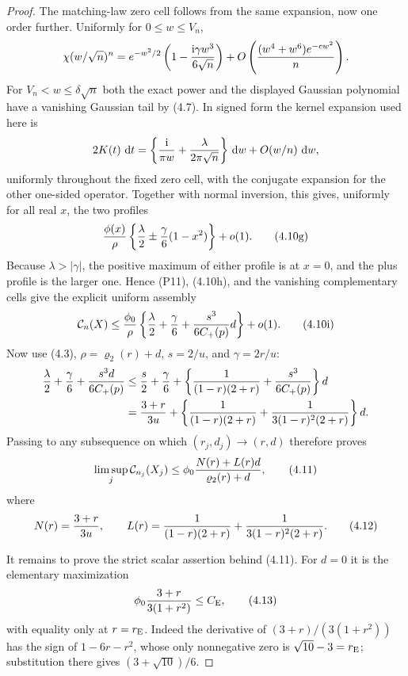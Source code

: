 \documentclass[11pt,a4paper]{article}
\numberwithin{equation}{section}
\theoremstyle{definition}
\theoremstyle{remark}
\newcommand{\ii}{\mathrm i}
\newcommand{\dd}{\,\mathrm d}
\newcommand{\CE}{C_{\mathrm E}}
\begin{document}
\begin{proof}
The matching-law zero cell follows from the same expansion, now one order
further.  Uniformly for $0\le w\le V_n$,
\[
 \chi(w/\sqrt n)^n=e^{-w^2/2}
       \left(1-{\ii\gamma w^3\over6\sqrt n}\right)
       +O\left({(w^4+w^6)e^{-cw^2}\over n}\right).
\]
For $V_n<w\le\delta\sqrt n$ both the exact power and the displayed
Gaussian polynomial have a vanishing Gaussian tail by (4.7).
In signed form the kernel expansion used here is
\[
 2K(t)\,\dd t=\left\{{\ii\over\pi w}
       +{\lambda\over2\pi\sqrt n}\right\}\dd w
       +O(w/n)\,\dd w,
\]
uniformly throughout the fixed zero cell, with the conjugate expansion for the
other one-sided operator.  Together with normal inversion, this gives,
uniformly for all real $x$, the two profiles
\[
 {\phi(x)\over\rho}
       \left\{{\lambda\over2}
          \mathbin\pm {\gamma\over6}(1-x^2)\right\}+o(1).          \tag{4.10g}
\]
Because $\lambda>|\gamma|$, the positive maximum of either profile is at
$x=0$, and the plus profile is the larger one.  Hence (P11), (4.10h), and
the vanishing complementary cells give the explicit uniform assembly
\[
 \mathcal C_n(X)\le {\phi_0\over\rho}
 \left\{{\lambda\over2}+{\gamma\over6}
                 +{s^3\over6C_+(p)}d\right\}+o(1).       \tag{4.10i}
\]
Now use (4.3), $\rho=\varrho_2(r)+d$, $s=2/u$, and $\gamma=2r/u$:
\begin{align*}
 {\lambda\over2}+{\gamma\over6}
                 +{s^3d\over6C_+(p)}
 &\le {s\over2}+{\gamma\over6}
  +\left\{{1\over(1-r)(2+r)}+{s^3\over6C_+(p)}\right\}d\\
 &= {3+r\over3u}
  +\left\{{1\over(1-r)(2+r)}
       +{1\over3(1-r)^2(2+r)}\right\}d.
\end{align*}
Passing to any subsequence on which $(r_j,d_j)\to(r,d)$ therefore proves
\[
 \limsup_j\mathcal C_{n_j}(X_j)
 \le \phi_0{N(r)+L(r)d\over\varrho_2(r)+d},            \tag{4.11}
\]
where
\[
 N(r)={3+r\over3u},\qquad
 L(r)={1\over(1-r)(2+r)}
      +{1\over3(1-r)^2(2+r)}.                          \tag{4.12}
\]

It remains to prove the strict scalar assertion behind (4.11).  For
$d=0$ it is the elementary maximization
\[
 \phi_0{3+r\over3(1+r^2)}\le\CE,                       \tag{4.13}
\]
with equality only at $r=r_{\rm E}$.  Indeed the derivative of
$(3+r)/(3(1+r^2))$ has the sign of $1-6r-r^2$, whose only nonnegative
zero is $\sqrt {10}-3=r_{\rm E}$; substitution there gives
$(3+\sqrt {10})/6$.


\end{proof}
\end{document}
